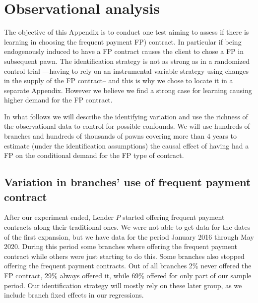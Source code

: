 \documentclass[oneside,11pt]{article}
\begin{document}



\newpage
\section{ Observational analysis}
\label{appendix_b}
\vspace{.2in}
\normalsize
\linespread{1.25}
\normalsize
\linespread{1.25}


The objective of this Appendix is to conduct one test aiming to assess if there is learning in choosing the frequent payment FP) contract. In particular if being endogenously induced to have a FP contract causes the client to chose a FP in subsequent pawn. The identification strategy is not as strong as in a randomized control trial ---having to rely on an instrumental variable strategy using changes in the supply of the FP contract-- and this is why we chose to locate it in a separate Appendix. However we believe we find a strong case for learning causing higher demand for the FP contract.

In what follows we will describe the identifying variation and use the richness of the observational data to control for possible confounds. We will use hundreds of branches and hundreds of thousands of pawns covering more than 4 years to estimate (under the identification assumptions) the causal effect of having had a FP on the conditional demand for the FP type of contract.


\vspace{.in}


\subsection{Variation in branches' use of frequent payment contract}

After our experiment ended, Lender $P$ started offering frequent payment contracts along their traditional ones. We were not able to get data for the dates of the first expansion, but we have data for the period January 2016 through May 2020. During this period some branches where offering the frequent payment contract while others were just starting to do this. Some branches also stopped offering the frequent payment contracts. Out of all branches 2\% never offered the FP contract, 29\% always offered it, while 69\% offered for only part of our sample period. Our identification strategy will mostly rely on these later group, as we include branch fixed effects in our regressions. \\
\end{document}

